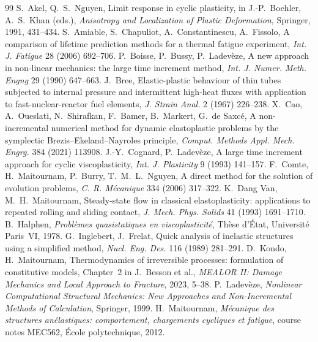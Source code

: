 \begin{chapterbib}{99}
 S.~Akel, Q.~S.~Nguyen, Limit response in cyclic plasticity, in J.-P.~Boehler, A.~S.~Khan (eds.), \emph{Anisotropy and Localization of Plastic Deformation}, Springer, 1991, 431--434.
 S.~Amiable, S.~Chapuliot, A.~Constantinescu, A.~Fissolo, A comparison of lifetime prediction methods for a thermal fatigue experiment, \emph{Int. J. Fatigue} 28 (2006) 692--706.
 P.~Boisse, P.~Bussy, P.~Ladev\`eze, A new approach in non-linear mechanics: the large time increment method, \emph{Int. J. Numer. Meth. Engng} 29 (1990) 647--663.
 J.~Bree, Elastic-plastic behaviour of thin tubes subjected to internal pressure and intermittent high-heat fluxes with application to fast-nuclear-reactor fuel elements, \emph{J. Strain Anal.} 2 (1967) 226--238.
 X.~Cao, A.~Oueslati, N.~Shirafkan, F.~Bamer, B.~Markert, G.~de Saxc\'e, A non-incremental numerical method for dynamic elastoplastic problems by the symplectic Brezis--Ekeland--Nayroles principle, \emph{Comput. Methods Appl. Mech. Engrg.} 384 (2021) 113908.
 J.-Y.~Cognard, P.~Ladev\`eze, A large time increment approach for cyclic viscoplasticity, \emph{Int. J. Plasticity} 9 (1993) 141--157.
 F.~Comte, H.~Maitournam, P.~Burry, T.~M.~L.~Nguyen, A direct method for the solution of evolution problems, \emph{C. R. M\'ecanique} 334 (2006) 317--322.
 K.~Dang Van, M.~H.~Maitournam, Steady-state flow in classical elastoplasticity: applications to repeated rolling and sliding contact, \emph{J. Mech. Phys. Solids} 41 (1993) 1691--1710.
 B.~Halphen, \emph{Probl\`emes quasistatiques en viscoplasticit\'e}, Th\`ese d'\'Etat, Universit\'e Paris~VI, 1978.
 G.~Inglebert, J.~Frelat, Quick analysis of inelastic structures using a simplified method, \emph{Nucl. Eng. Des.} 116 (1989) 281--291.
 D.~Kondo, H.~Maitournam, Thermodynamics of irreversible processes: formulation of constitutive models, Chapter~2 in J.~Besson et al., \emph{MEALOR II: Damage Mechanics and Local Approach to Fracture}, 2023, 5--38.
 P.~Ladev\`eze, \emph{Nonlinear Computational Structural Mechanics: New Approaches and Non-Incremental Methods of Calculation}, Springer, 1999.
 H.~Maitournam, \emph{M\'ecanique des structures an\'elastiques: comportement, chargements cycliques et fatigue}, course notes MEC562, \'Ecole polytechnique, 2012.

\end{chapterbib}
